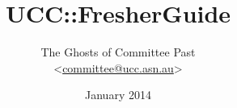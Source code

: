 \begin{titlepage}


\title{UCC::FresherGuide}
\author{The Ghosts of Committee Past\cite{committee} \\ <\href{mailto:committee@ucc.asn.au}{committee@ucc.asn.au}>}

\date{January 2014}

\maketitle
\centering

\end{titlepage}
